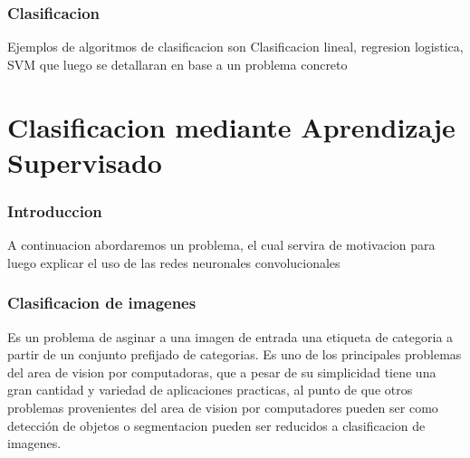 \documentclass[a4paper,12pt,spanish]{book}
\begin{document}
      \subsubsection{Clasificacion}

      Ejemplos de algoritmos de clasificacion son Clasificacion lineal, regresion logistica, SVM que luego se detallaran en base a un problema concreto
    \section{Clasificacion mediante Aprendizaje Supervisado}
      \subsubsection{Introduccion}
	A continuacion abordaremos un problema, el cual servira de motivacion para luego explicar el uso de las redes neuronales convolucionales

      \subsubsection{Clasificacion de imagenes}
	Es un problema de asginar a una imagen de entrada una etiqueta de categoria a partir de un conjunto prefijado de categorias.
	Es uno de los principales problemas del area de vision por computadoras, que a pesar de su simplicidad tiene una gran cantidad y variedad de aplicaciones practicas, 
	al punto de que otros problemas provenientes del area de vision por computadores pueden ser como detección de objetos o segmentacion pueden ser reducidos a clasificacion de imagenes.
\end{document}
